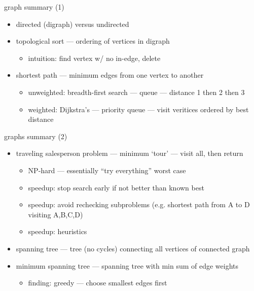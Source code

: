 \begin{frame}{graph summary (1)}
\begin{itemize}
\item directed (digraph) versus undirected
\item topological sort --- ordering of vertices in digraph
    \begin{itemize}
    \item intuition: find vertex w/ no in-edge, delete
    \end{itemize}
\item shortest path --- minimum edges from one vertex to another
    \begin{itemize}
    \item unweighted: breadth-first search --- queue --- distance 1 then 2 then 3
    \item weighted: Dijkstra's --- priority queue --- visit veritices ordered by best distance
    \end{itemize}
\end{itemize}
\end{frame}

\begin{frame}{graphs summary (2)}
\begin{itemize}
\item traveling salesperson problem --- minimum `tour' --- visit all, then return
    \begin{itemize}
    \item NP-hard --- essentially ``try everything'' worst case
    \item speedup: stop search early if not better than known best
    \item speedup: avoid rechecking subproblems (e.g. shortest path from A to D visiting A,B,C,D)
    \item speedup: heuristics
    \end{itemize}
\item spanning tree --- tree (no cycles) connecting all vertices of connected graph
\item minimum spanning tree --- spanning tree with min sum of edge weights
    \begin{itemize}
    \item finding: greedy --- choose smallest edges first
    \end{itemize}
\end{itemize}
\end{frame}

